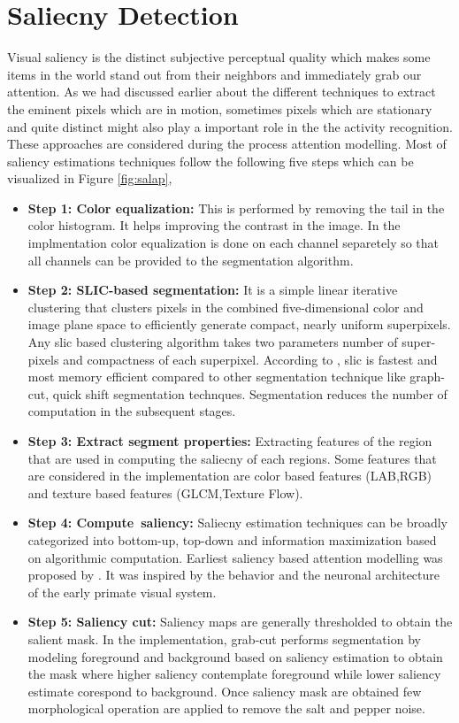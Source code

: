 \section{Saliecny Detection}
Visual saliency is the distinct subjective perceptual quality which makes some items in the world stand out from their neighbors and immediately grab our attention.
As we had discussed earlier about the different techniques to extract the eminent pixels which are in motion, sometimes pixels which are stationary and quite distinct might also play a important role in the the activity recognition. These approaches are considered during the process attention modelling. Most of saliency estimations techniques follow the following five steps which can be visualized in Figure \ref{fig:salap},
\begin{itemize}
\item{\textbf{Step 1: Color equalization:} This is performed by removing the tail in the color histogram. It helps improving the contrast in the image. In the implmentation color equalization is done on each channel separetely so that all channels can be provided to the segmentation algorithm.}

\item{ \textbf{Step 2: SLIC-based segmentation:}  It is a simple linear iterative clustering that clusters pixels in the combined five-dimensional color and image plane space to efficiently generate compact, nearly uniform superpixels. Any slic based clustering algorithm takes two parameters number of super-pixels and compactness of each superpixel. According to \cite{slic}, slic is fastest and most memory efficient compared to  other segmentation technique like graph-cut, quick shift segmentation technques. Segmentation reduces the number of computation in the subsequent stages.}

\item{ \textbf{Step 3: Extract segment properties:} Extracting features of the region that are used in computing the saliecny of each regions. Some features that are considered in the implementation are color based features (LAB,RGB) and texture based features (GLCM,Texture Flow).}

\item{\textbf{Step 4: Compute~saliency:} Saliecny estimation techniques can be broadly categorized into bottom-up, top-down and information maximization based on algorithmic computation. Earliest saliency based attention modelling was proposed by \cite{itti}. It was inspired by the behavior and the neuronal architecture of the early primate visual system.}

\item{\textbf{Step 5: Saliency cut:} Saliency maps are generally thresholded to obtain the salient mask. In the implementation, grab-cut\citep{grabcut} performs segmentation by modeling foreground and background based on saliency estimation to obtain the mask where higher saliency  contemplate foreground while lower saliency estimate corespond to background. Once saliency mask are obtained few morphological operation are applied to remove the salt and pepper noise.}
\end{itemize}

